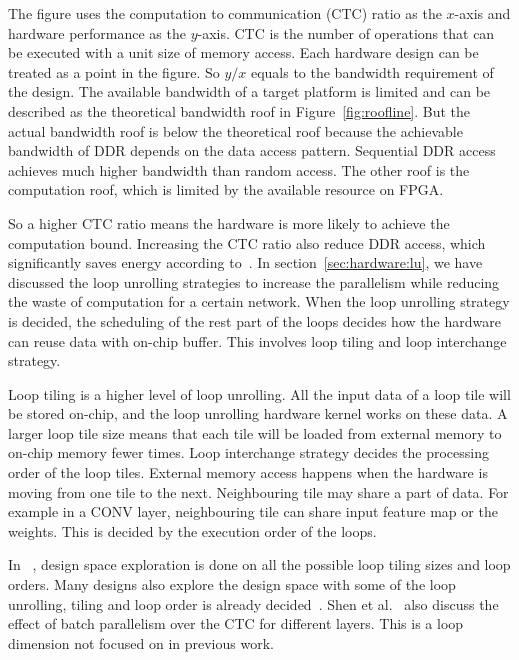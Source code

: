 The figure uses the computation to communication (CTC) ratio as the $x$-axis and hardware performance as the $y$-axis. CTC is the number of operations that can be executed with a unit size of memory access. Each hardware design can be treated as a point in the figure. So $y/x$ equals to the bandwidth requirement of the design. The available bandwidth of a target platform is limited and can be described as the theoretical bandwidth roof in Figure~\ref{fig:roofline}. But the actual bandwidth roof is below the theoretical roof because the achievable bandwidth of DDR depends on the data access pattern. Sequential DDR access achieves much higher bandwidth than random access. The other roof is the computation roof, which is limited by the available resource on FPGA.

So a higher CTC ratio means the hardware is more likely to achieve the computation bound. Increasing the CTC ratio also reduce DDR access, which significantly saves energy according to~\cite{vlsi_energy}. In section~\ref{sec:hardware:lu}, we have discussed the loop unrolling strategies to increase the parallelism while reducing the waste of computation for a certain network. When the loop unrolling strategy is decided, the scheduling of the rest part of the loops decides how the hardware can reuse data with on-chip buffer. This involves loop tiling and loop interchange strategy.

Loop tiling is a higher level of loop unrolling. All the input data of a loop tile will be stored on-chip, and the loop unrolling hardware kernel works on these data. A larger loop tile size means that each tile will be loaded from external memory to on-chip memory fewer times. Loop interchange strategy decides the processing order of the loop tiles. External memory access happens when the hardware is moving from one tile to the next. Neighbouring tile may share a part of data. For example in a CONV layer, neighbouring tile can share input feature map or the weights. This is decided by the execution order of the loops. 

In ~\cite{zhang2015optimizing, ma2017optimizing}, design space exploration is done on all the possible loop tiling sizes and loop orders. Many designs also explore the design space with some of the loop unrolling, tiling and loop order is already decided~\cite{motamedi2016design, qiu2016going}. Shen et al.~\cite{shen2017escher} also discuss the effect of batch parallelism over the CTC for different layers. This is a loop dimension not focused on in previous work.

